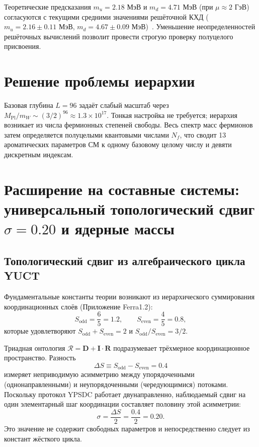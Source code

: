 \documentclass[12pt,a4paper]{article}
\begin{document}
	Теоретические предсказания $m_u = 2.18$ МэВ и $m_d = 4.71$ МэВ (при $\mu \approx 2$ ГэВ) согласуются с текущими средними значениями решёточной КХД ($m_u = 2.16 \pm 0.11$ МэВ, $m_d = 4.67 \pm 0.09$ МэВ)~\cite{PDG2024}. Уменьшение неопределенностей решёточных вычислений позволит провести строгую проверку полуцелого присвоения.
	
	\section{Решение проблемы иерархии}
	
	Базовая глубина $L=96$ задаёт слабый масштаб через $M_{\mathrm{Pl}}/m_W \sim (3/2)^{96} \approx 1.3\times10^{17}$. Тонкая настройка не требуется; иерархия возникает из числа фермионных степеней свободы. Весь спектр масс фермионов затем определяется полуцелыми квантовыми числами $N_f$, что сводит 13 ароматических параметров СМ к одному базовому целому числу и девяти дискретным индексам.
	
	\section{Расширение на составные системы: универсальный топологический сдвиг \(\sigma=0.20\) и ядерные массы}
	\label{sec:sigma_nuclear}
	
	\subsection{Топологический сдвиг из алгебраического цикла YUCT}
	
	Фундаментальные константы теории возникают из иерархического суммирования координационных слоёв (Приложение Ferra1.2):
	\[
	S_{\mathrm{odd}} = \frac{6}{5}=1.2,\qquad S_{\mathrm{even}} = \frac{4}{5}=0.8,
	\]
	которые удовлетворяют \(S_{\mathrm{odd}}+S_{\mathrm{even}}=2\) и \(S_{\mathrm{odd}}/S_{\mathrm{even}}=3/2\).
	
	Триадная онтология \(\mathcal{R} = \mathbf{D} + \mathbf{I}\!\cdot\!\mathbf{R}\) подразумевает трёхмерное координационное пространство. Разность
	\[
	\Delta S \equiv S_{\mathrm{odd}} - S_{\mathrm{even}} = 0.4
	\]
	измеряет неприводимую асимметрию между упорядоченными (однонаправленными) и неупорядоченными (чередующимися) потоками. Поскольку протокол YPSDC работает двунаправленно, наблюдаемый сдвиг на один элементарный шаг координации составляет половину этой асимметрии:
	\begin{equation}
		\boxed{\sigma = \frac{\Delta S}{2} = \frac{0.4}{2} = 0.20.}
		\label{eq:sigma_fermion_paper}
	\end{equation}
	Это значение не содержит свободных параметров и непосредственно следует из констант жёсткого цикла.
	
\end{document}
